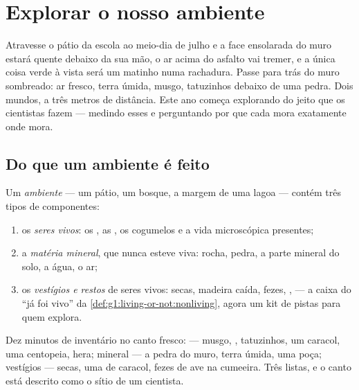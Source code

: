 \chapter{Explorar o nosso ambiente}\label{ch:g6:exploring-our-environment}

Atravesse o pátio da escola ao meio-dia de julho e a face ensolarada
do muro estará quente debaixo da sua mão, o ar acima do asfalto vai
tremer, e a única coisa verde à vista será um matinho numa rachadura.
Passe para trás do muro sombreado: ar fresco, terra úmida, musgo,
tatuzinhos debaixo de uma pedra. Dois mundos, a três metros de
distância. Este ano começa explorando  do jeito que os
cientistas fazem --- medindo esses  e perguntando por que
cada  mora exatamente onde mora.

\section{Do que um ambiente é feito}

\begin{definition}\label{def:g6:exploring-our-environment:components}
Um \emph{ambiente} --- um pátio, um bosque, a margem
de uma lagoa --- contém três tipos de componentes:
\begin{enumerate}
  \item os \emph{seres vivos}: os , as
        , os cogumelos e a vida microscópica presentes;
  \item a \emph{matéria mineral}, que nunca
        esteve viva: rocha, pedra, a parte mineral do solo, a água,
        o ar;
  \item os \emph{vestígios e restos} de seres vivos:  secas,
        madeira caída, fezes, ,  --- a caixa do ``já foi
        vivo'' da \cref{def:g1:living-or-not:nonliving}, agora um kit
        de pistas para quem explora.
\end{enumerate}
\end{definition}

\begin{example}\label{ex:g6:exploring-our-environment:inventory}
Dez minutos de inventário no canto fresco:  --- musgo,
, tatuzinhos, um caracol, uma centopeia, hera; mineral ---
a pedra do muro, terra úmida, uma poça; vestígios ---  secas,
uma  de caracol, fezes de ave na cumeeira. Três listas, e o
canto está descrito como o sítio de um cientista.
\end{example}

